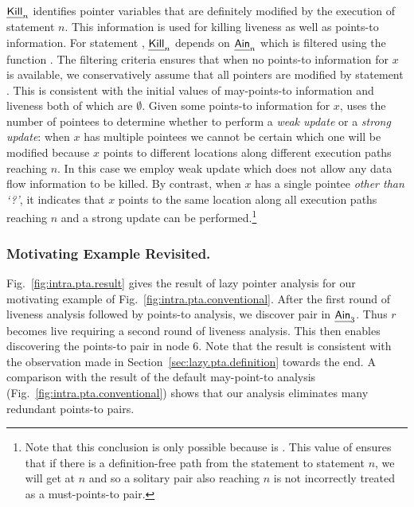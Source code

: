 \documentclass{llncs}
\newcommand{\Start}[1]{\text{{\sf\em start}$_{#1}$}\xspace}
\newcommand{\boundary}{\text{\sf\em BI}\xspace}
\newcommand{\pt}[2]{\text{$(#1,#2)$}}
\newcommand{\lin}{\text{{\sf\em Lin\/}}\xspace}
\newcommand{\ain}{\text{{\sf\em Ain\/}}\xspace}
\newcommand{\must}{\text{\sf\em Must\/}\xspace}
\newcommand{\Kill}{\text{{\sf\em Kill}}\xspace}
\begin{document}
$\Kill_n$ identifies pointer variables that are definitely modified by
the execution of statement $n$. This information is used for killing
liveness as well as points-to information. For statement ,
$\Kill_n$ depends on $\ain_n$ which is filtered using the function
\must. The filtering criteria ensures that when no points-to information
for $x$ is available, we conservatively assume that all pointers are
modified by statement . This is consistent with the
initial values of may-points-to information and liveness both of which
are $\emptyset$. Given some points-to information for $x$, \must
uses the number of pointees to determine whether to perform a {\em weak
update\/} or a {\em strong update\/}: when $x$ has multiple pointees
we cannot be certain which one will be modified because $x$ points to
different locations along different execution paths reaching $n$. In
this case we employ weak update which does not allow any data flow
information to be killed. By contrast, when $x$ has a single pointee
{\em other than `?'}, it indicates that $x$ points to the same location
along all execution paths reaching $n$ and a strong update can be
performed.\footnote{ Note that this conclusion is only possible because
\boundary is \text{$\lin_n\times\{?\}$}. This value of \boundary ensures
that if there is a definition-free path from the \Start{p} statement
to statement $n$, we will get \pt{x}{?} at $n$ and so a solitary
pair \pt{x}{z} also reaching $n$ is not incorrectly treated as a
must-points-to pair.}



\subsubsection{Motivating Example Revisited.}
Fig.~\ref{fig:intra.pta.result} gives the result of
lazy pointer analysis for our motivating example of
Fig.~\ref{fig:intra.pta.conventional}. After the first round of
liveness analysis followed by points-to analysis, we discover pair
\pt{p}{r} in $\ain_3$. Thus $r$ becomes live requiring a second round
of liveness analysis. This then enables discovering the points-to pair
\pt{r}{s} in node 6. 
Note that the result is consistent with the observation
made in Section~\ref{sec:lazy.pta.definition} towards the end.
A comparison with the result of the default may-point-to analysis
(Fig.~\ref{fig:intra.pta.conventional}) shows that
our analysis eliminates many redundant points-to pairs. 
\end{document}
